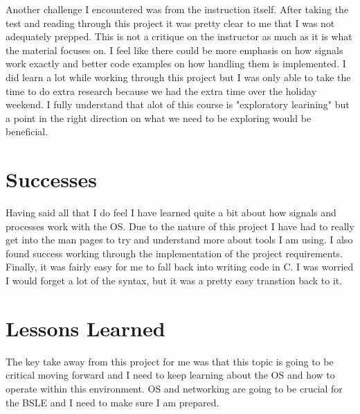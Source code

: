 \documentclass{article}
\begin{document}
\noindent Another challenge I encountered was from the instruction itself. After taking the test and reading through this project it was pretty clear to me that I was not adequately prepped. This is not a critique on the instructor as much as it is what the material focuses on. I feel like there could be more emphasis on how signals work exactly and better code examples on how handling them is implemented. I did learn a lot while working through this project but I was only able to take the time to do extra research because we had the extra time over the holiday weekend. I fully understand that alot of this course is "exploratory learining" but a point in the right direction on what we need to be exploring would be beneficial. \\

\section{Successes}

Having said all that I do feel I have learned quite a bit about how signals and processes work with the OS. Due to the nature of this project I have had to really get into the man pages to try and understand more about tools I am using. I also found success working through the implementation of the project requirements. Finally, it was fairly easy for me to fall back into writing code in C. I was worried I would forget a lot of the syntax, but it was a pretty easy transtion back to it.\\

\pagebreak

\section{Lessons Learned}

The key take away from this project for me was that this topic is going to be critical moving forward and I need to keep learning about the OS and how to operate within this environment. OS and networking are going to be crucial for the BSLE and I need to make sure I am prepared.\\
\end{document}

